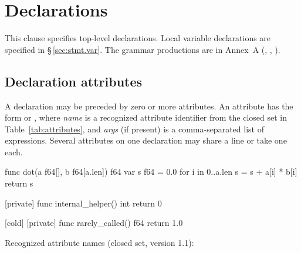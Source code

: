\chapter{Declarations}
\label{sec:10-declarations}

\pnum
This clause specifies top-level declarations.  Local variable declarations
are specified in \S\,\ref{sec:stmt.var}.  The grammar productions are in
Annex~A (, ,
).

\section{Declaration attributes}
\label{sec:decl.attributes}

\pnum
A declaration may be preceded by zero or more attributes.  An attribute
has the form \tok{[name]} or , where \textit{name} is
a recognized attribute identifier from the closed set in
Table~\ref{tab:attributes}, and \textit{args} (if present) is a
comma-separated list of expressions.  Several attributes on one declaration may share
a line or take one each.

\begin{laincode}
[hot]
func dot(a f64[], b f64[a.len]) f64 {
    var s f64 = 0.0
    for i in 0..a.len { s = s + a[i] * b[i] }
    return s
}

[private]
func internal_helper() int { return 0 }

[cold]
[private]
func rarely_called() f64 { return 1.0 }
\end{laincode}

\pnum
Recognized attribute names (closed set, version 1.1):

